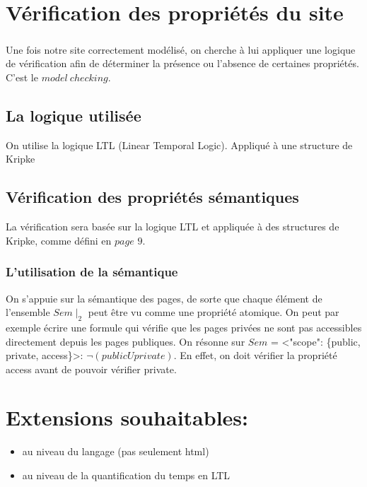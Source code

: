 \documentclass[a4paper]{report}
\begin{document}
\chapter*{ Vérification des propriétés du site }

\paragraph*{}
Une fois notre site correctement modélisé, on cherche à lui appliquer une logique de vérification afin de déterminer la présence ou l’absence de certaines propriétés. C'est le $model\ checking$.\\

\section*{La logique utilisée}
On utilise la logique LTL (Linear Temporal Logic).
Appliqué à une structure de Kripke

\section*{Vérification des propriétés sémantiques}





La vérification sera basée sur la logique LTL et appliquée à des structures de Kripke, comme défini en $page$ $9$.\\
\subsection*{ L'utilisation de la sémantique }
On s'appuie sur la sémantique des pages, de sorte que chaque élément de l'ensemble $Sem \mid_2$ peut être vu comme une propriété atomique. On peut par exemple écrire une formule qui vérifie que les pages privées ne sont pas accessibles directement depuis les pages publiques. On résonne sur $Sem$ = <"scope": \{public, private, access\}>: $\neg(public U private)$. En effet, on doit vérifier la propriété access avant de pouvoir vérifier private.\\


\chapter*{ Extensions souhaitables: }

\begin{itemize}
\item au niveau du langage (pas seulement html)
\item au niveau de la quantification du temps en LTL
\end{itemize}
\end{document}
